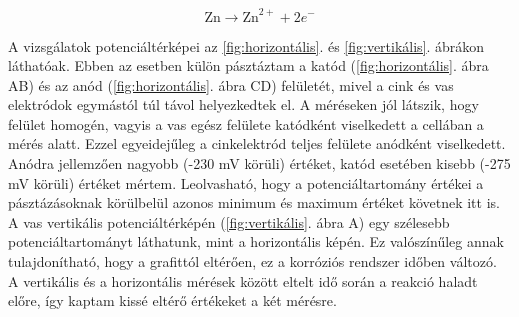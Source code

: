 \begin{equation}
\textrm{Zn} \longrightarrow \textrm{Zn}^{2+} + 2e^- 
\label{cink_anod}
\end{equation}


A vizsgálatok potenciáltérképei az \ref{fig:horizontális}. és \ref{fig:vertikális}. ábrákon láthatóak. Ebben az esetben külön pásztáztam a katód (\ref{fig:horizontális}. ábra AB) és az anód (\ref{fig:horizontális}. ábra CD) felületét, mivel a cink és vas elektródok egymástól túl távol helyezkedtek el. A méréseken jól látszik, hogy felület homogén, vagyis a vas egész felülete katódként viselkedett a cellában a mérés alatt. Ezzel egyeidejűleg a cinkelektród teljes felülete anódként viselkedett. Anódra jellemzően nagyobb (-230 mV körüli) értéket, katód esetében kisebb (-275 mV körüli) értéket mértem. Leolvasható, hogy a potenciáltartomány értékei a pásztázásoknak körülbelül azonos minimum és maximum értéket követnek itt is. A vas vertikális potenciáltérképén (\ref{fig:vertikális}. ábra A) egy szélesebb potenciáltartományt láthatunk, mint a horizontális képén. Ez valószínűleg annak tulajdonítható, hogy a grafittól eltérően, ez a korróziós rendszer időben változó. A vertikális és a horizontális mérések között eltelt idő során a reakció haladt előre, így kaptam kissé eltérő értékeket a két mérésre. 


